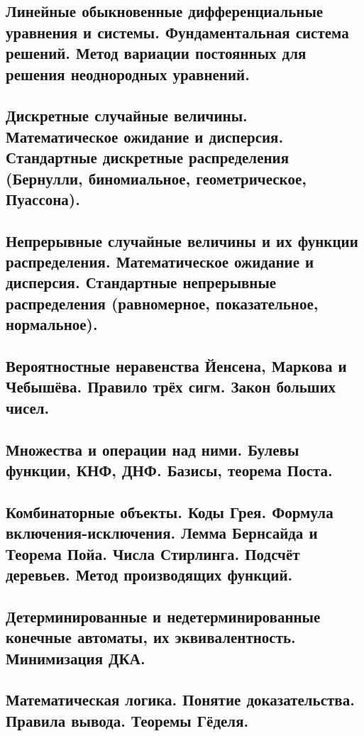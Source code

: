 \documentclass{article}
\begin{document}
\subsection{Линейные обыкновенные дифференциальные уравнения и системы. Фундаментальная система решений. Метод вариации постоянных для решения неоднородных уравнений.}

\subsection{Дискретные случайные величины. Математическое ожидание и дисперсия. Стандартные дискретные распределения (Бернулли, биномиальное, геометрическое, Пуассона).}

\subsection{Непрерывные случайные величины и их функции распределения. Математическое ожидание и дисперсия. Стандартные непрерывные распределения (равномерное, показательное, нормальное).}

\subsection{Вероятностные неравенства Йенсена, Маркова и Чебышёва. Правило трёх сигм. Закон больших чисел.}

\subsection{Множества и операции над ними. Булевы функции, КНФ, ДНФ. Базисы, теорема Поста.}

\subsection{Комбинаторные объекты. Коды Грея. Формула включения-исключения. Лемма Бернсайда и Теорема Пойа. Числа Стирлинга. Подсчёт деревьев. Метод производящих функций.}

\subsection{Детерминированные и недетерминированные конечные автоматы, их эквивалентность. Минимизация ДКА.}

\subsection{Математическая логика. Понятие доказательства. Правила вывода. Теоремы Гёделя.}
\end{document}
